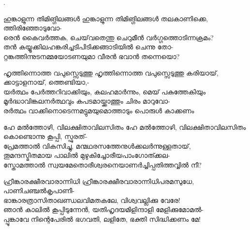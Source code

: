 \begin{enumerate}

.


\begin{slokam}{\VSv}{\TMV}{ഹുങ്കാളുന്ന തിമിങ്ഗിലങ്ങള്‍}
ഹുങ്കാളുന്ന തിമിങ്ഗിലങ്ങള്‍ തലകാണിക്കെ, ത്തിരിഞ്ഞോടുവോ-\\
രെൻ കൈവർത്തക, ചെയ്‌വതെന്തു ചെറുമീൻ വർഗ്ഗത്തൊടിന്നക്രമം?\\
തൻ കയ്യൂക്കിലഹങ്കരിച്ചടിപിടിക്കങ്ങാടിയിൽ ചെന്നു തോ-\\
റ്റങ്കത്തിന്നുടനമ്മയോടണയുമാ വീരൻ ഭവാൻ തന്നെയൊ?
\end{slokam}




\begin{slokam}{\VSv}{\RV}{ഹൃത്തിന്നൊത്ത വപുസ്സെടുത്തു}
ഹൃത്തിന്നൊത്ത വപുസ്സെടുത്തു കരിയായ്‌, ക്കാട്ടാളനായ്‌, ത്തെണ്ടിയാ,-\\
യർത്ഥം പേർത്തറിവാക്കിയും, കലഹമാർന്നും, മെയ്‌ പകുത്തേകിയും\\
മൂർദ്ധാവിങ്കലനർത്ഥവും കപടമായ്ക്കാത്തും ചിരം മാറുവോ-\\
രർത്ഥം വാക്കിനൊടെന്നമട്ടുമയുമൊത്താടും പൊരുൾ കാക്കണം
\end{slokam}



\begin{slokam}{\VSv}{\VNM}{ഹേ മൽത്തോഴി, വിലക്ഷിതാവിലസിതം}
ഹേ മൽത്തോഴി, വിലക്ഷിതാവിലസിതം കൊണ്ടൊന്നു കൂപ്പി, സ്ഫുരത്- \\
പ്രേമത്താൽ വികസിച്ചു, മന്മഥരസത്തേനുൾക്കലർന്നുള്ളതായ്, \\
തൂമന്ദസ്മിതമായ പാലിൽ മുഴുകിച്ചോരീയപാംഗോത്ക്കല- \\
സ്തോമത്താൽ സ്വയമേതൊരീശ്വരനെയാണർച്ചിപ്പതിത്തവ്വിൽ നീ? 
\end{slokam}




\begin{slokam}{\VSr}{\VNM}{ഹ്രീങ്കാരക്ഷീരവാരാന്നിധി}
 ഹ്രീങ്കാരക്ഷീരവാരാന്നിധിപരമസുധേ, പാണിചഞ്ചൽകൃപാണീ-\\
ഭാങ്കാരത്രാസിതാഖണ്ഡലവിമതകലേ, വിശ്വവല്ലിക്കു വേരേ!\\
ഞാൻ കാലിൽ കൂപ്പിടുന്നേൻ, യതിഹൃദയമിളിന്ദാളി മേളിക്കുമോമൽ-\\
പ്പൂങ്കാവേ നിന്റെപേരിൽ ഭഗവതി, ലളിതേ, ഭക്തി സിദ്ധിക്കണം മേ!
\end{slokam}



\end{enumerate}

